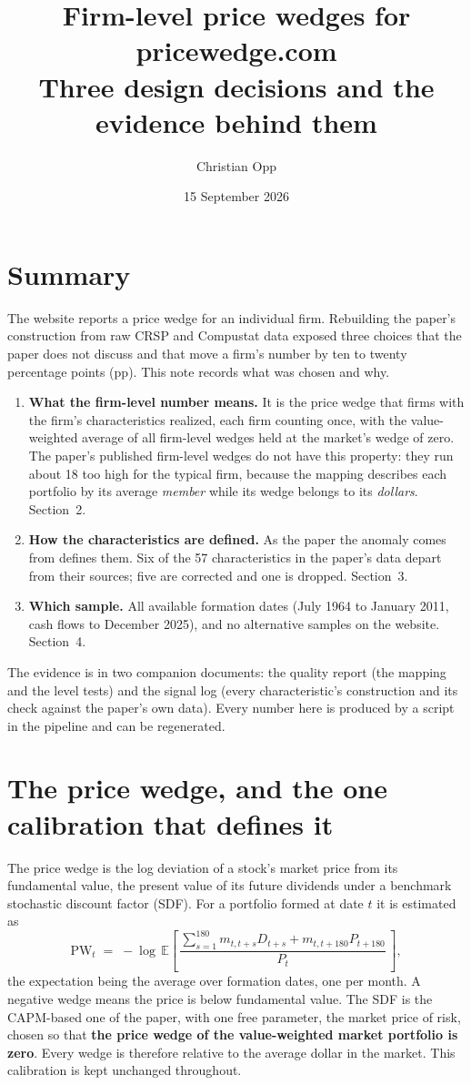 \documentclass[11pt]{article}
\title{Firm-level price wedges for pricewedge.com\\[2pt]\large Three design decisions and the evidence behind them}
\author{Christian Opp}
\date{15 September 2026}
\begin{document}
\maketitle

\section*{Summary}

The website reports a price wedge for an individual firm. Rebuilding the
paper's construction from raw CRSP and Compustat data exposed three choices
that the paper does not discuss and that move a firm's number by ten to twenty
percentage points (pp). This note records what was chosen and why.

\begin{enumerate}[nosep,leftmargin=*]
\item \textbf{What the firm-level number means.} It is the price wedge that
firms with the firm's characteristics realized, each firm counting once,
with the value-weighted average of all firm-level wedges held at the
market's wedge of zero. The paper's published firm-level wedges do not have
this property: they run about 18\pp{} too high for the typical firm, because
the mapping describes each portfolio by its average \emph{member} while its
wedge belongs to its \emph{dollars}. Section~2.
\item \textbf{How the characteristics are defined.} As the paper the anomaly
comes from defines them. Six of the 57 characteristics in the paper's data
depart from their sources; five are corrected and one is dropped.
Section~3.
\item \textbf{Which sample.} All available formation dates (July 1964 to
January 2011, cash flows to December 2025), and no alternative samples on
the website. Section~4.
\end{enumerate}

The evidence is in two companion documents: the quality report (the mapping
and the level tests) and the signal log (every characteristic's
construction and its check against the paper's own data). Every number here
is produced by a script in the pipeline and can be regenerated.

\section{The price wedge, and the one calibration that defines it}

The price wedge is the log deviation of a stock's market price from its
fundamental value, the present value of its future dividends under a
benchmark stochastic discount factor (SDF). For a portfolio formed at date
$t$ it is estimated as
\[
\mathrm{PW}_t \;=\; -\log\, \mathbb{E}\!\left[\,\frac{\sum_{s=1}^{180} m_{t,t+s} D_{t+s} + m_{t,t+180} P_{t+180}}{P_t}\,\right],
\]
the expectation being the average over formation dates, one per month. A
negative wedge means the price is below fundamental value. The SDF is the
CAPM-based one of the paper, with one free parameter, the market price of
risk, chosen so that \textbf{the price wedge of the value-weighted market
portfolio is zero}. Every wedge is therefore relative to the average dollar
in the market. This calibration is kept unchanged throughout.
\end{document}
